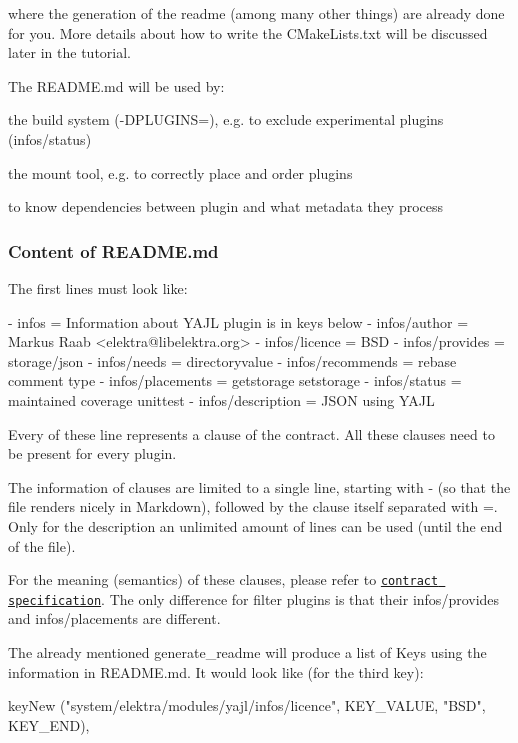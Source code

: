 where the generation of the readme (among many other things) are already done for you. More details about how to write the {\ttfamily C\+Make\+Lists.\+txt} will be discussed later in the tutorial.

The {\ttfamily R\+E\+A\+D\+M\+E.\+md} will be used by\+:


\begin{DoxyItemize}
\item the build system ({\ttfamily -\/\+D\+P\+L\+U\+G\+I\+NS=}), e.\+g. to exclude experimental plugins ({\ttfamily infos/status})
\item the mount tool, e.\+g. to correctly place and order plugins
\item to know dependencies between plugin and what metadata they process
\end{DoxyItemize}

\subsubsection*{Content of {\ttfamily R\+E\+A\+D\+M\+E.\+md}}

The first lines must look like\+:


\begin{DoxyCode}
- infos = Information about YAJL plugin is in keys below
- infos/author = Markus Raab <elektra@libelektra.org>
- infos/licence = BSD
- infos/provides = storage/json
- infos/needs = directoryvalue
- infos/recommends = rebase comment type
- infos/placements = getstorage setstorage
- infos/status = maintained coverage unittest
- infos/description = JSON using YAJL
\end{DoxyCode}


Every of these line represents a clause of the contract. All these clauses need to be present for every plugin.

The information of clauses are limited to a single line, starting with {\ttfamily -\/} (so that the file renders nicely in Markdown), followed by the clause itself separated with {\ttfamily =}. Only for the description an unlimited amount of lines can be used (until the end of the file).

For the meaning (semantics) of these clauses, please refer to \href{/home/markus/Projekte/Elektra/current/doc/CONTRACT.ini}{\tt contract specification}. The only difference for filter plugins is that their {\ttfamily infos/provides} and {\ttfamily infos/placements} are different.

The already mentioned {\ttfamily generate\+\_\+readme} will produce a list of Keys using the information in {\ttfamily R\+E\+A\+D\+M\+E.\+md}. It would look like (for the third key)\+: \begin{DoxyVerb}    keyNew ("system/elektra/modules/yajl/infos/licence",
            KEY_VALUE, "BSD", KEY_END),
\end{DoxyVerb}


